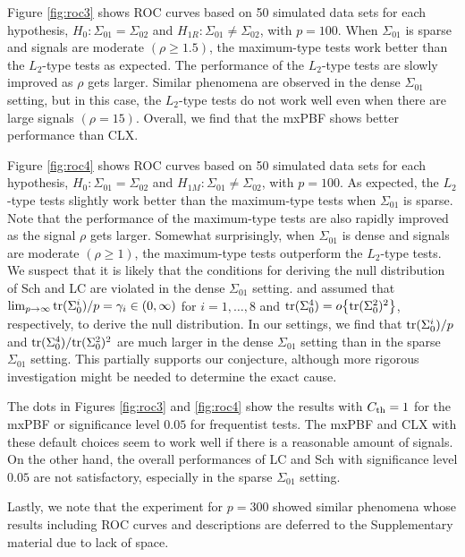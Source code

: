 \documentclass[11pt]{article}
\newcommand{\sg}{\Sigma}
\begin{document}
Figure \ref{fig:roc3} shows ROC curves based on 50 simulated data sets for each hypothesis, $H_0: \sg_{01} = \sg_{02}$ and $H_{1R} : \sg_{01} \neq \sg_{02}$, with $p=100$.
When $\sg_{01}$ is sparse and signals are moderate $(\rho \ge 1.5)$, the maximum-type tests work better than the $L_2$-type tests as expected.
The performance of the $L_2$-type tests are slowly improved as $\rho$ gets larger.
Similar phenomena are observed in the dense $\sg_{01}$ setting, but in this case, the $L_2$-type tests do not work well even when there are large signals $(\rho =15)$.
Overall, we find that the mxPBF shows better performance than CLX.






Figure \ref{fig:roc4} shows ROC curves based on 50 simulated data sets for each hypothesis, $H_0: \sg_{01} = \sg_{02}$ and $H_{1M} : \sg_{01} \neq \sg_{02}$, with $p=100$.
As expected, the $L_2$-type tests slightly work better than the maximum-type tests when $\sg_{01}$ is sparse.
Note that the performance of the maximum-type tests are also rapidly improved as the signal $\rho$ gets larger.
Somewhat surprisingly, when $\sg_{01}$ is dense and signals are moderate $(\rho \ge 1)$, the maximum-type tests outperform the $L_2$-type tests.
We suspect that it is likely that the conditions for deriving the null distribution of Sch and LC are violated in the dense $\sg_{01}$ setting.
\cite{schott2007test} and \cite{li2012two} assumed that $\lim_{p\to\infty} {\rm tr}( \sg_0^i )/p =\gamma_i \in (0,\infty)$ for $i=1,\ldots, 8$ and ${\rm tr}(\sg_0^4) =  o \big\{  {\rm tr}(\sg_0^2)^2 \big\}$, respectively, to derive the null distribution.
In our settings, we find that ${\rm tr}( \sg_0^i )/p$ and ${\rm tr}(\sg_0^4)  / {\rm tr}(\sg_0^2)^2$ are much larger in the dense $\sg_{01}$ setting than in the sparse $\sg_{01}$ setting.
This partially supports our conjecture, although more rigorous investigation might be needed to determine the exact cause.



The dots in Figures \ref{fig:roc3} and \ref{fig:roc4} show the results with $C_{\rm th} =1$ for the mxPBF or significance level $0.05$ for frequentist tests.
The mxPBF and CLX with these default choices seem to work well if there is a reasonable amount of signals. 
On the other hand, the overall performances of LC and Sch with significance level $0.05$ are not satisfactory, especially in the sparse $\sg_{01}$ setting.


Lastly, we note that the experiment for $p=300$ showed similar phenomena whose results including ROC curves and descriptions are deferred to the Supplementary material due to lack of space. 
\end{document}
